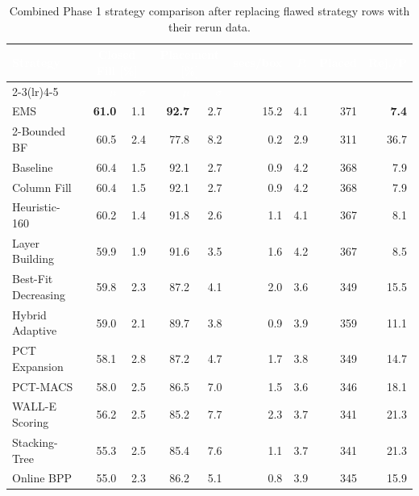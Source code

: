 \begin{table}[htbp]
\centering
\caption{Combined Phase 1 strategy comparison after replacing flawed strategy rows with their rerun data.}
\label{tab:botko-overcoupled-phase1}
\small
\setlength{\tabcolsep}{4pt}
\renewcommand{\arraystretch}{1.15}
\begin{tabular}{lrrrrrrrr}
\toprule
\rowcolor{headerblue}
\textcolor{white}{\textbf{Strategy}} & \multicolumn{2}{c}{\textcolor{white}{\textbf{Closed Fill [\%]}}} & \multicolumn{2}{c}{\textcolor{white}{\textbf{Placement [\%]}}} & \textcolor{white}{\textbf{secs/box}} & \textcolor{white}{\textbf{$\overline{P_c}$}} & \textcolor{white}{\textbf{Placed}} & \textcolor{white}{\textbf{Rej./P}} \\
\cmidrule(lr){2-3}\cmidrule(lr){4-5}
\rowcolor{headerblue}
 & \textcolor{white}{$\mu$} & \textcolor{white}{$\sigma$} & \textcolor{white}{$\mu$} & \textcolor{white}{$\sigma$} & & & & \\
\midrule
EMS & \textcolor{bestgreen}{\textbf{61.0}} & 1.1 & \textcolor{bestgreen}{\textbf{92.7}} & 2.7 & 15.2 & 4.1 & 371 & \textcolor{bestgreen}{\textbf{7.4}} \\
\rowcolor{rowalt} 2-Bounded BF & 60.5 & 2.4 & 77.8 & 8.2 & 0.2 & 2.9 & 311 & 36.7 \\
Baseline & 60.4 & 1.5 & 92.1 & 2.7 & 0.9 & 4.2 & 368 & 7.9 \\
\rowcolor{rowalt} Column Fill & 60.4 & 1.5 & 92.1 & 2.7 & 0.9 & 4.2 & 368 & 7.9 \\
Heuristic-160 & 60.2 & 1.4 & 91.8 & 2.6 & 1.1 & 4.1 & 367 & 8.1 \\
\rowcolor{rowalt} Layer Building & 59.9 & 1.9 & 91.6 & 3.5 & 1.6 & 4.2 & 367 & 8.5 \\
Best-Fit Decreasing & 59.8 & 2.3 & 87.2 & 4.1 & 2.0 & 3.6 & 349 & 15.5 \\
\rowcolor{rowalt} Hybrid Adaptive & 59.0 & 2.1 & 89.7 & 3.8 & 0.9 & 3.9 & 359 & 11.1 \\
PCT Expansion & 58.1 & 2.8 & 87.2 & 4.7 & 1.7 & 3.8 & 349 & 14.7 \\
\rowcolor{rowalt} PCT-MACS & 58.0 & 2.5 & 86.5 & 7.0 & 1.5 & 3.6 & 346 & 18.1 \\
WALL-E Scoring & 56.2 & 2.5 & 85.2 & 7.7 & 2.3 & 3.7 & 341 & 21.3 \\
\rowcolor{rowalt} Stacking-Tree & 55.3 & 2.5 & 85.4 & 7.6 & 1.1 & 3.7 & 341 & 21.3 \\
Online BPP & 55.0 & 2.3 & 86.2 & 5.1 & 0.8 & 3.9 & 345 & 15.9 \\

\end{tabular}
\end{table}
